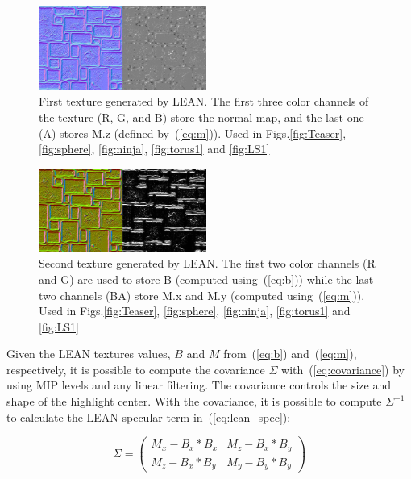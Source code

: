 \documentclass[10pt, conference]{IEEEtran}
\begin{document}
\begin{figure}[h]
	\includegraphics[width=0.49\textwidth]{figs/Lean1.png}
	\caption{First texture generated by LEAN. The first three color channels of the texture (R, G, and B) store the normal map, and the last one (A) stores M.z (defined by~(\ref{eq:m})). Used in Figs.\ref{fig:Teaser}, \ref{fig:sphere}, \ref{fig:ninja}, \ref{fig:torus1} and \ref{fig:LS1}}
	\label{fig:Lean1}
\end{figure}

\begin{figure}[h]
	\includegraphics[width=0.49\textwidth]{figs/Lean2.png}
	\caption{Second texture generated by LEAN. The first two color channels (R and G) are used to store B (computed using~(\ref{eq:b})) while the last two channels (BA) store M.x and M.y (computed using~(\ref{eq:m})). Used in Figs.\ref{fig:Teaser}, \ref{fig:sphere}, \ref{fig:ninja}, \ref{fig:torus1} and \ref{fig:LS1}}
	\label{fig:Lean2}
\end{figure}

Given the LEAN textures values, $B$ and $M$ from~(\ref{eq:b}) and~(\ref{eq:m}), respectively, it is possible to compute the covariance $\Sigma$ with~(\ref{eq:covariance}) by using MIP levels and any linear filtering. The covariance controls the size and shape of the highlight center. With the covariance, it is possible to compute $\Sigma^{-1}$ to calculate the LEAN specular term in~(\ref{eq:lean_spec}):

\begin{equation}
	\label{eq:covariance}
	\Sigma = \left( \begin{smallmatrix} M_{x} - B_{x} * B_{x} & M_{z} - B_{x} * B_{y}\\ M_{z} - B_{x} * B_{y} & M_{y} - B_{y} * B_{y} \end{smallmatrix} \right)
\end{equation}
\end{document}
